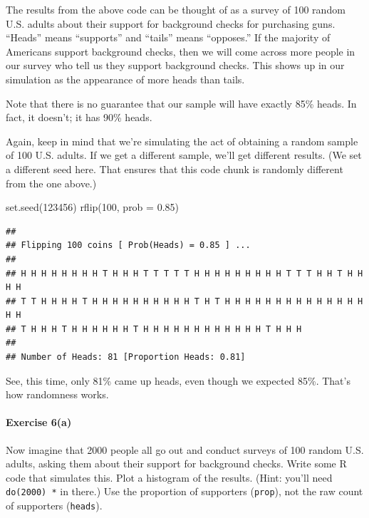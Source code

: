 \documentclass[
]{book}
\newenvironment{Shaded}{\begin{snugshade}}{\end{snugshade}}
\newcommand{\AttributeTok}[1]{\textcolor[rgb]{0.77,0.63,0.00}{#1}}
\newcommand{\DecValTok}[1]{\textcolor[rgb]{0.00,0.00,0.81}{#1}}
\newcommand{\FloatTok}[1]{\textcolor[rgb]{0.00,0.00,0.81}{#1}}
\newcommand{\FunctionTok}[1]{\textcolor[rgb]{0.00,0.00,0.00}{#1}}
\newcommand{\NormalTok}[1]{#1}
\begin{document}
The results from the above code can be thought of as a survey of 100 random U.S. adults about their support for background checks for purchasing guns. ``Heads'' means ``supports'' and ``tails'' means ``opposes.'' If the majority of Americans support background checks, then we will come across more people in our survey who tell us they support background checks. This shows up in our simulation as the appearance of more heads than tails.

Note that there is no guarantee that our sample will have exactly 85\% heads. In fact, it doesn't; it has 90\% heads.

Again, keep in mind that we're simulating the act of obtaining a random sample of 100 U.S. adults. If we get a different sample, we'll get different results. (We set a different seed here. That ensures that this code chunk is randomly different from the one above.)

\begin{Shaded}
\begin{Highlighting}[]
\FunctionTok{set.seed}\NormalTok{(}\DecValTok{123456}\NormalTok{)}
\FunctionTok{rflip}\NormalTok{(}\DecValTok{100}\NormalTok{, }\AttributeTok{prob =} \FloatTok{0.85}\NormalTok{)}
\end{Highlighting}
\end{Shaded}

\begin{verbatim}
## 
## Flipping 100 coins [ Prob(Heads) = 0.85 ] ...
## 
## H H H H H H H H T H H H T T T T T H H H H H H H H H T T T H H T H H H H
## T T H H H H T H H H H H H H H H H T H T H H H H H H H H H H H H H H H H
## T H H H T H H H H H H T H H H H H H H H H H H H T H H H
## 
## Number of Heads: 81 [Proportion Heads: 0.81]
\end{verbatim}

See, this time, only 81\% came up heads, even though we expected 85\%. That's how randomness works.

\hypertarget{exercise-6a-2}{%
\paragraph*{Exercise 6(a)}\label{exercise-6a-2}}

Now imagine that 2000 people all go out and conduct surveys of 100 random U.S. adults, asking them about their support for background checks. Write some R code that simulates this. Plot a histogram of the results. (Hint: you'll need \texttt{do(2000)\ *} in there.) Use the proportion of supporters (\texttt{prop}), not the raw count of supporters (\texttt{heads}).
\end{document}
